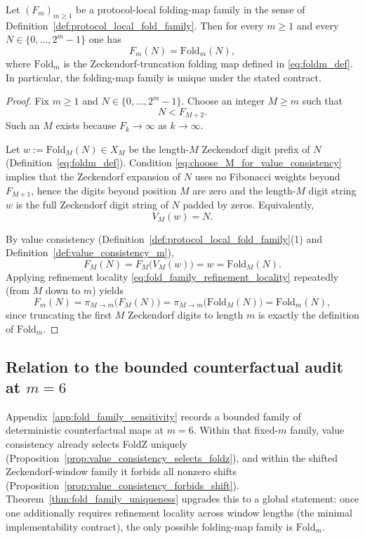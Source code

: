 \begin{theorem}\label{thm:fold_family_uniqueness}
Let $(F_m)_{m\ge 1}$ be a protocol-local folding-map family in the sense of Definition~\ref{def:protocol_local_fold_family}.
Then for every $m\ge 1$ and every $N\in\{0,\dots,2^m-1\}$ one has
\[
F_m(N)=\mathrm{Fold}_m(N),
\]
where $\mathrm{Fold}_m$ is the Zeckendorf-truncation folding map defined in \eqref{eq:foldm_def}.
In particular, the folding-map family is unique under the stated contract.
\end{theorem}
\begin{proof}
Fix $m\ge 1$ and $N\in\{0,\dots,2^m-1\}$.
Choose an integer $M\ge m$ such that
\begin{equation}\label{eq:choose_M_for_value_consistency}
N<F_{M+2}.
\end{equation}
Such an $M$ exists because $F_{k}\to\infty$ as $k\to\infty$.

Let $w:=\mathrm{Fold}_M(N)\in X_M$ be the length-$M$ Zeckendorf digit prefix of $N$ (Definition~\eqref{eq:foldm_def}).
Condition \eqref{eq:choose_M_for_value_consistency} implies that the Zeckendorf expansion of $N$ uses no Fibonacci weights beyond $F_{M+1}$, hence the digits beyond position $M$ are zero and the length-$M$ digit string $w$ is the full Zeckendorf digit string of $N$ padded by zeros.
Equivalently,
\begin{equation}\label{eq:VM_of_foldM_is_N}
V_M(w)=N.
\end{equation}

By value consistency (Definition~\ref{def:protocol_local_fold_family}(1) and Definition~\ref{def:value_consistency_m}),
\[
F_M(N)=F_M\!\bigl(V_M(w)\bigr)=w=\mathrm{Fold}_M(N).
\]
Applying refinement locality \eqref{eq:fold_family_refinement_locality} repeatedly (from $M$ down to $m$) yields
\[
F_m(N)=\pi_{M\to m}\!\bigl(F_M(N)\bigr)=\pi_{M\to m}\!\bigl(\mathrm{Fold}_M(N)\bigr)=\mathrm{Fold}_m(N),
\]
since truncating the first $M$ Zeckendorf digits to length $m$ is exactly the definition of $\mathrm{Fold}_m$.
\end{proof}

\subsection{Relation to the bounded counterfactual audit at \texorpdfstring{$m=6$}{m=6}}
\label{subsec:fold_family_uniqueness_relation_m6}

Appendix~\ref{app:fold_family_sensitivity} records a bounded family of deterministic counterfactual maps at $m=6$.
Within that fixed-$m$ family, value consistency already selects FoldZ uniquely (Proposition~\ref{prop:value_consistency_selects_foldz}), and within the shifted Zeckendorf-window family it forbids all nonzero shifts (Proposition~\ref{prop:value_consistency_forbids_shift}).
Theorem~\ref{thm:fold_family_uniqueness} upgrades this to a global statement: once one additionally requires refinement locality across window lengths (the minimal implementability contract), the only possible folding-map family is $\mathrm{Fold}_m$.

